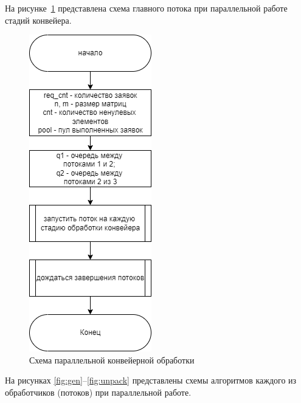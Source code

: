 На рисунке~\ref{fig:thr} представлена схема главного потока при параллельной работе стадий конвейера.

\begin{figure}[h]
	\centering
	\includegraphics[height=0.5\textheight]{img/thr.png}
	\caption{Схема параллельной конвейерной обработки}
	\label{fig:thr}
\end{figure}

На рисунках \ref{fig:gen}--\ref{fig:unpack} представлены схемы алгоритмов каждого из обработчиков (потоков) при параллельной работе.

